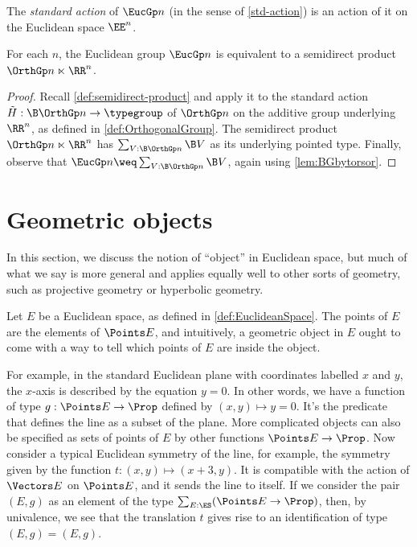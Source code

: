 The {\em standard action} of $\EucGp n$ (in the sense of \cref{std-action}) is
an action of it on the Euclidean space $\EE^n$.

\begin{theorem}\label{thm:EuclideanGroupSemidirect}
  For each $n$, the Euclidean group $\EucGp n$ is equivalent to a semidirect
  product $\OrthGp n \ltimes \RR^n$.
\end{theorem}

\begin{proof}
  Recall \cref{def:semidirect-product} and apply it to the standard action
  $\tilde H : \B \OrthGp n \to \typegroup$ of $\OrthGp n$ on the additive group
  underlying $\RR^n$, as defined in \cref{def:OrthogonalGroup}.
  The semidirect product $\OrthGp n \ltimes \RR^n$ has
  $\sum_{V:\B \OrthGp n} \B V$ as its underlying pointed type.
  Finally, observe that $\EucGp n \weq \sum_{V:\B \OrthGp n} \B V$, again
  using \cref{lem:BGbytorsor}.
\end{proof}

\section{Geometric objects}

In this section, we discuss the notion of ``object'' in Euclidean space, but
much of what we say is more general and applies equally well to other sorts of
geometry, such as projective geometry or hyperbolic geometry.

Let $E$ be a Euclidean space, as defined in \cref{def:EuclideanSpace}.  The
points of $E$ are the elements of $\Points E$, and intuitively, a geometric
object in $E$ ought to come with a way to tell which points of $E$ are inside
the object.

For example, in the standard Euclidean plane with coordinates labelled $x$ and
$y$, the $x$-axis is described by the equation $y=0$.  In other words, we have
a function of type $g : \Points E \to \Prop$ defined by $(x,y) \mapsto y=0$.
It's the predicate that defines the line as a subset of the plane.  More
complicated objects can also be specified as sets of points of $E$ by other
functions $\Points E \to \Prop$.  Now consider a typical Euclidean symmetry of
the line, for example, the symmetry given by the function $t : (x,y) \mapsto (x+3,y)$.
It is compatible with the action of $\Vectors E$ on $\Points E$, and it sends
the line to itself.  If we consider the pair $(E,g)$ as an element of the type
$\sum_{E:\ES} (\Points E \to \Prop)$, then, by univalence, we see that the
translation $t$ gives rise to an identification of type $(E,g) = (E,g)$.


